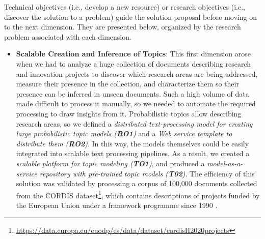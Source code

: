 Technical objectives (i.e., develop a new resource) or research objectives (i.e., discover the solution to a problem) guide the solution proposal before moving on to the next dimension. They are presented below, organized by the research problem associated with each dimension.

\begin{itemize}
\item \textbf{Scalable Creation and Inference of Topics}: This first dimension arose when we had to analyze a huge collection of documents describing research and innovation projects to discover which research areas are being addressed, measure their presence in the collection, and characterize them so their presence can be inferred in unseen documents. Such a high volume of data made difficult to process it manually, so we needed to automate the required processing to draw insights from it. Probabilistic topics allow describing research areas, so we defined a \textit{distributed text-processing model for creating large probabilistic topic models (\textbf{RO1})} and a \textit{Web service template to distribute them (\textbf{RO2})}. In this way, the models themselves could be easily integrated into scalable text processing pipelines. As a result, we created a \textit{scalable platform for topic modeling (\textbf{TO1})}, and produced a \textit{model-as-a-service repository with pre-trained topic models (\textbf{T02})}. The efficiency of this solution was validated by processing a corpus of 100,000 documents collected from the CORDIS dataset\footnote{\url{https://data.europa.eu/euodp/es/data/dataset/cordisH2020projects}}, which contains descriptions of projects funded by the European Union under a framework programme since 1990 \citep{Badenes-Olmedo2017}. 


\end{itemize}
